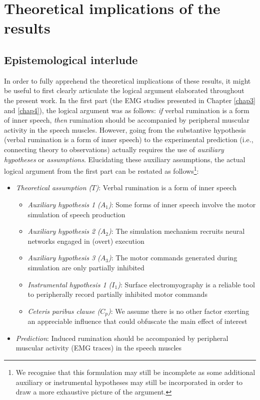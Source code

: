 \documentclass[a4paper,12pt,twoside,openright,oldfontcommands]{memoir}
\providecommand{\tightlist}{%
  \setlength{\itemsep}{0pt}\setlength{\parskip}{0pt}}
\let\rmarkdownfootnote\footnote%
\def\footnote{\protect\rmarkdownfootnote}
\begin{document}
\hypertarget{theoretical-implications-of-the-results}{%
\section{Theoretical implications of the results}\label{theoretical-implications-of-the-results}}

\hypertarget{epistemological-interlude}{%
\subsection{Epistemological interlude}\label{epistemological-interlude}}

In order to fully apprehend the theoretical implications of these results, it might be useful to first clearly articulate the logical argument elaborated throughout the present work. In the first part (the EMG studies presented in Chapter \ref{chap3} and \ref{chap4}), the logical argument was as follows: \emph{if} verbal rumination is a form of inner speech, \emph{then} rumination should be accompanied by peripheral muscular activity in the speech muscles. However, going from the substantive hypothesis (verbal rumination is a form of inner speech) to the experimental prediction (i.e., connecting theory to observations) actually requires the use of \emph{auxiliary hypotheses} or \emph{assumptions}. Elucidating these auxiliary assumptions, the actual logical argument from the first part can be restated as follows\footnote{We recognise that this formulation may still be incomplete as some additional auxiliary or instrumental hypotheses may still be incorporated in order to draw a more exhaustive picture of the argument.}:

\begin{itemize}
\item
  \emph{Theoretical assumption (\(T\))}: Verbal rumination is a form of inner speech

  \begin{itemize}
  \tightlist
  \item
    \emph{Auxiliary hypothesis 1 (\(A_{1}\))}: Some forms of inner speech involve the motor simulation of speech production
  \item
    \emph{Auxiliary hypothesis 2 (\(A_{2}\))}: The simulation mechanism recruits neural networks engaged in (overt) execution
  \item
    \emph{Auxiliary hypothesis 3 (\(A_{3}\))}: The motor commands generated during simulation are only partially inhibited
  \item
    \emph{Instrumental hypothesis 1 (\(I_{1}\))}: Surface electromyography is a reliable tool to peripherally record partially inhibited motor commands
  \item
    \emph{Ceteris paribus clause (\(C_{p}\))}: We assume there is no other factor exerting an appreciable influence that could obfuscate the main effect of interest
  \end{itemize}
\item
  \emph{Prediction}: Induced rumination should be accompanied by peripheral muscular activity (EMG traces) in the speech muscles
\end{itemize}
\end{document}
